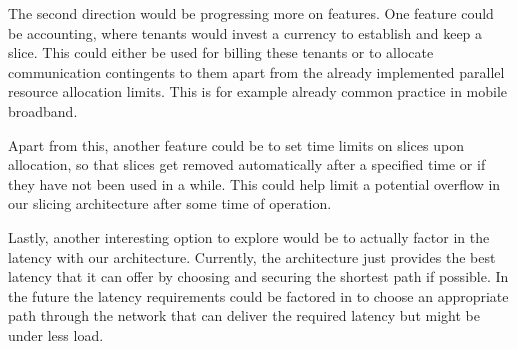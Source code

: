 The second direction would be progressing more on features. One feature could be accounting, where tenants would invest a currency to establish and keep a slice. This could either be used for billing these tenants or to allocate communication contingents to them apart from the already implemented parallel resource allocation limits. This is for example already common practice in mobile broadband.

Apart from this, another feature could be to set time limits on slices upon allocation, so that slices get removed automatically after a specified time or if they have not been used in a while. This could help limit a potential overflow in our slicing architecture after some time of operation.

Lastly, another interesting option to explore would be to actually factor in the latency with our architecture. Currently, the architecture just provides the best latency that it can offer by choosing and securing the shortest path if possible. In the future the latency requirements could be factored in to choose an appropriate path through the network that can deliver the required latency but might be under less load.